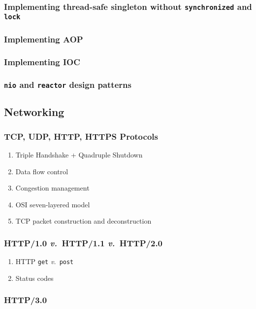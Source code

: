\documentclass[11pt, twocolumn]{article}
\newcommand{\versus}{\textit{v.}\ }
\begin{document}
\subsubsection{Implementing thread-safe singleton without \texttt{synchronized} and \texttt{lock}}

\subsubsection{Implementing AOP}

\subsubsection{Implementing IOC}

\subsubsection{\texttt{nio} and \texttt{reactor} design patterns}

\subsection{Networking}

\subsubsection{TCP, UDP, HTTP, HTTPS Protocols}
\begin{enumerate}
	\item Triple Handshake + Quadruple Shutdown
	\item Data flow control
	\item Congestion management
	\item OSI seven-layered model
	\item TCP packet construction and deconstruction
\end{enumerate}

\subsubsection{HTTP/1.0 \versus HTTP/1.1 \versus HTTP/2.0}
\begin{enumerate}
	\item HTTP \texttt{get} \versus \texttt{post}
	\item Status codes
\end{enumerate}

\subsubsection{HTTP/3.0}
\end{document}
